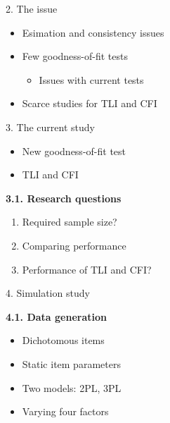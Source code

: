 \documentclass[aspectratio=169]{beamer}
\begin{document}
\begin{frame}{2. The issue}

\begin{itemize}
	\item{Esimation and consistency issues}
	\item{Few goodness-of-fit tests}
		\begin{itemize}
			\item{Issues with current tests}
		\end{itemize}
	\item{Scarce studies for TLI and CFI}
\end{itemize}

\end{frame}

\begin{frame}{3. The current study}

\begin{itemize}
	\item{New goodness-of-fit test}
	\item{TLI and CFI}
\end{itemize}

\vspace{1cm}


\begin{block}{\textbf{3.1. Research questions}}


\begin{enumerate}
	\item{Required sample size?}
	\item{Comparing performance}
	\item{Performance of TLI and CFI?}
\end{enumerate}

\end{block}

\end{frame}

\begin{frame}{4. Simulation study}

\begin{block}{\textbf{4.1. Data generation}}
\begin{itemize}
	\item{Dichotomous items}
	\item{Static item parameters}
	\item{Two models: 2PL, 3PL}
	\item{Varying four factors}
\end{itemize}

\end{block}

\end{frame}
\end{document}
